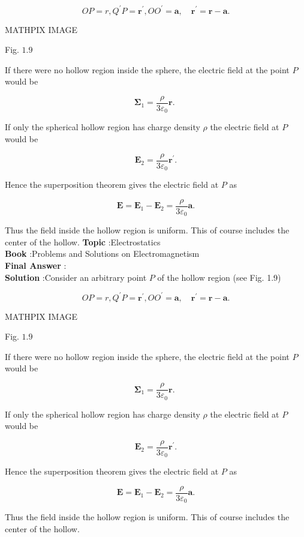 \documentclass[10pt]{article}
\begin{document}
$$
O P=r, Q^{\prime} P=\mathbf{r}^{\prime}, O O^{\prime}=\mathbf{a}, \quad \mathbf{r}^{\prime}=\mathbf{r}-\mathbf{a} .
$$

MATHPIX IMAGE

Fig. $1.9$

If there were no hollow region inside the sphere, the electric field at the point $P$ would be

$$
\mathbf{\Sigma}_{1}=\frac{\rho}{3 \varepsilon_{0}} \mathbf{r} \text {. }
$$

If only the spherical hollow region has charge density $\rho$ the electric field at $P$ would be

$$
\boldsymbol{E}_{2}=\frac{\rho}{3 \varepsilon_{0}} \mathbf{r}^{\prime} .
$$

Hence the superposition theorem gives the electric field at $P$ as

$$
\mathbf{E}=\mathbf{E}_{1}-\mathbf{E}_{2}=\frac{\rho}{3 \varepsilon_{0}} \mathbf{a} .
$$

Thus the field inside the hollow region is uniform. This of course includes the center of the hollow.
\textbf{Topic} :Electrostatics\\
\textbf{Book} :Problems and Solutions on Electromagnetism\\
\textbf{Final Answer} : \\


\textbf{Solution} :Consider an arbitrary point $P$ of the hollow region (see Fig. 1.9)

$$
O P=r, Q^{\prime} P=\mathbf{r}^{\prime}, O O^{\prime}=\mathbf{a}, \quad \mathbf{r}^{\prime}=\mathbf{r}-\mathbf{a} .
$$

MATHPIX IMAGE

Fig. $1.9$

If there were no hollow region inside the sphere, the electric field at the point $P$ would be

$$
\mathbf{\Sigma}_{1}=\frac{\rho}{3 \varepsilon_{0}} \mathbf{r} \text {. }
$$

If only the spherical hollow region has charge density $\rho$ the electric field at $P$ would be

$$
\boldsymbol{E}_{2}=\frac{\rho}{3 \varepsilon_{0}} \mathbf{r}^{\prime} .
$$

Hence the superposition theorem gives the electric field at $P$ as

$$
\mathbf{E}=\mathbf{E}_{1}-\mathbf{E}_{2}=\frac{\rho}{3 \varepsilon_{0}} \mathbf{a} .
$$

Thus the field inside the hollow region is uniform. This of course includes the center of the hollow.
\end{document}
